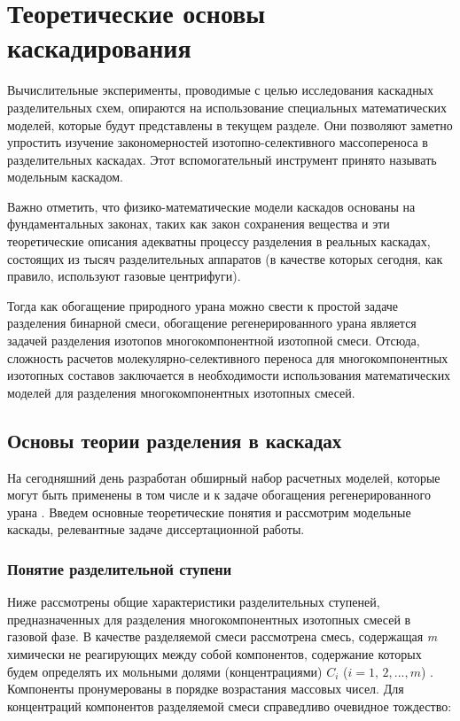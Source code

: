 \chapter{Теоретические основы каскадирования}

Вычислительные эксперименты, проводимые с целью исследования каскадных разделительных схем, опираются на использование специальных математических моделей, которые будут представлены в текущем разделе. Они позволяют заметно упростить изучение закономерностей изотопно-селективного массопереноса в разделительных каскадах. Этот вспомогательный инструмент принято называть модельным каскадом.

Важно отметить, что физико-математические модели каскадов основаны на фундаментальных законах, таких как закон сохранения вещества и эти теоретические описания адекватны процессу разделения в реальных каскадах, состоящих из тысяч разделительных аппаратов (в качестве которых сегодня, как правило, используют газовые центрифуги).

Тогда как обогащение природного урана можно свести к простой задаче разделения бинарной смеси, обогащение регенерированного урана является задачей разделения изотопов многокомпонентной изотопной смеси. Отсюда, сложность расчетов молекулярно-селективного переноса для многокомпонентных изотопных составов заключается в необходимости использования математических моделей для разделения многокомпонентных изотопных смесей.

\section{Основы теории разделения в каскадах}

На сегодняшний день разработан обширный набор расчетных моделей, которые могут быть применены в том числе и к задаче обогащения регенерированного урана \cite{smirnovMolekulyarnoselektivnyyMassoperenosKomponentov2013}. Введем основные теоретические понятия и рассмотрим модельные каскады, релевантные задаче диссертационной работы.

\subsection{Понятие разделительной ступени}

Ниже рассмотрены общие характеристики разделительных ступеней, предназначенных для разделения многокомпонентных изотопных смесей в газовой фазе. В качестве разделяемой смеси рассмотрена смесь, содержащая \textit{m} химически не реагирующих между собой компонентов, содержание которых будем определять их мольными долями (концентрациями) $C_{i}$ ($i=1,\, 2,...,m$) \cite{sulaberidzeTeoriyaKaskadovDlya2011}. Компоненты пронумерованы в порядке возрастания массовых чисел. Для концентраций компонентов разделяемой смеси справедливо очевидное тождество:

